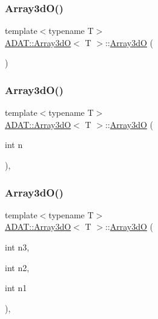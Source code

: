 \subsubsection{\texorpdfstring{Array3dO()}{Array3dO()}\hspace{0.1cm}{\footnotesize\ttfamily [5/8]}}
{\footnotesize\ttfamily template$<$typename T$>$ \\
\mbox{\hyperlink{classADAT_1_1Array3dO}{A\+D\+A\+T\+::\+Array3dO}}$<$ T $>$\+::\mbox{\hyperlink{classADAT_1_1Array3dO}{Array3dO}} (\begin{DoxyParamCaption}{ }\end{DoxyParamCaption})\hspace{0.3cm}{\ttfamily [inline]}}

\mbox{\label{classADAT_1_1Array3dO_a4546b7e563774cfcdbe0be19cabbb854}} 
\subsubsection{\texorpdfstring{Array3dO()}{Array3dO()}\hspace{0.1cm}{\footnotesize\ttfamily [6/8]}}
{\footnotesize\ttfamily template$<$typename T$>$ \\
\mbox{\hyperlink{classADAT_1_1Array3dO}{A\+D\+A\+T\+::\+Array3dO}}$<$ T $>$\+::\mbox{\hyperlink{classADAT_1_1Array3dO}{Array3dO}} (\begin{DoxyParamCaption}\item[{int}]{n }\end{DoxyParamCaption})\hspace{0.3cm}{\ttfamily [inline]}, {\ttfamily [explicit]}}

\mbox{\label{classADAT_1_1Array3dO_aed93788a8b6356d91260f6a5afa80f9b}} 
\subsubsection{\texorpdfstring{Array3dO()}{Array3dO()}\hspace{0.1cm}{\footnotesize\ttfamily [7/8]}}
{\footnotesize\ttfamily template$<$typename T$>$ \\
\mbox{\hyperlink{classADAT_1_1Array3dO}{A\+D\+A\+T\+::\+Array3dO}}$<$ T $>$\+::\mbox{\hyperlink{classADAT_1_1Array3dO}{Array3dO}} (\begin{DoxyParamCaption}\item[{int}]{n3,  }\item[{int}]{n2,  }\item[{int}]{n1 }\end{DoxyParamCaption})\hspace{0.3cm}{\ttfamily [inline]}, {\ttfamily [explicit]}}


